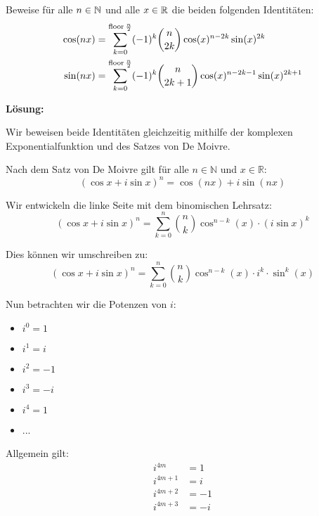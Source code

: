\begin{prob}
  Beweise für alle $n \in \mathbb{N}$ und alle $x \in \mathbb{R}$ die beiden folgenden
  Identitäten:
  \begin{equation*}
    \begin{split}
      \cos(nx) &= \sum_{k=0}^{\operatorname{floor}{\frac{n}{2}}} (-1)^k\binom{n}{2k} \cos(x)^{n-2k}\sin(x)^{2k}\\
      \sin(nx) &= \sum_{k=0}^{\operatorname{floor}{\frac{n}{2}}} (-1)^k\binom{n}{2k+1} \cos(x)^{n-2k-1}\sin(x)^{2k+1}
    \end{split}
  \end{equation*}
\end{prob}

\textbf{Lösung:}

Wir beweisen beide Identitäten gleichzeitig mithilfe der komplexen Exponentialfunktion und des Satzes von De Moivre.

Nach dem Satz von De Moivre gilt für alle $n \in \mathbb{N}$ und $x \in \mathbb{R}$:
\begin{equation}
(\cos x + i\sin x)^n = \cos(nx) + i\sin(nx)
\end{equation}

Wir entwickeln die linke Seite mit dem binomischen Lehrsatz:
\begin{equation}
(\cos x + i\sin x)^n = \sum_{k=0}^{n} \binom{n}{k} \cos^{n-k}(x) \cdot (i\sin x)^k
\end{equation}

Dies können wir umschreiben zu:
\begin{equation}
(\cos x + i\sin x)^n = \sum_{k=0}^{n} \binom{n}{k} \cos^{n-k}(x) \cdot i^k \cdot \sin^k(x)
\end{equation}

Nun betrachten wir die Potenzen von $i$:
\begin{itemize}
  \item $i^0 = 1$
  \item $i^1 = i$
  \item $i^2 = -1$
  \item $i^3 = -i$
  \item $i^4 = 1$
  \item ...
\end{itemize}

Allgemein gilt:
\begin{align}
  i^{4m} &= 1\\
  i^{4m+1} &= i\\
  i^{4m+2} &= -1\\
  i^{4m+3} &= -i
\end{align}


